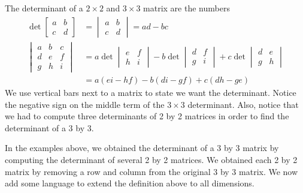 \begin{definition}\label{determinat of 2 by 2 and 3 by 3}
 The determinant of a {$2\times 2$} and {$3\times 3$} matrix are the numbers 
\begin{align*}
\det\begin{bmatrix}a&b\\c&d\end{bmatrix} &=\begin{vmatrix}a&b\\c&d\end{vmatrix} = ad-bc\\
\begin{vmatrix}a&b&c\\d&e&f\\g&h&i\end{vmatrix} &= a\det\begin{vmatrix}e&f\\h&i\end{vmatrix} -b\det\begin{vmatrix}d&f\\g&i\end{vmatrix} +c\det\begin{vmatrix}d&e\\g&h\end{vmatrix}\\
&=a(ei-hf)-b(di-gf)+c(dh-ge)
\end{align*}
We use vertical bars next to a matrix to state we want the determinant. Notice the negative sign on the middle term of the {$3 \times 3$} determinant. Also, notice that we had to compute three determinants of 2 by 2 matrices in order to find the determinant of a 3 by 3.  
\end{definition}

In the examples above, we obtained the determinant of a 3 by 3 matrix by computing the determinant of several 2 by 2 matrices.  We obtained each 2 by 2 matrix by removing a row and column from the original 3 by 3 matrix. We now add some language to extend the definition above to all dimensions.

